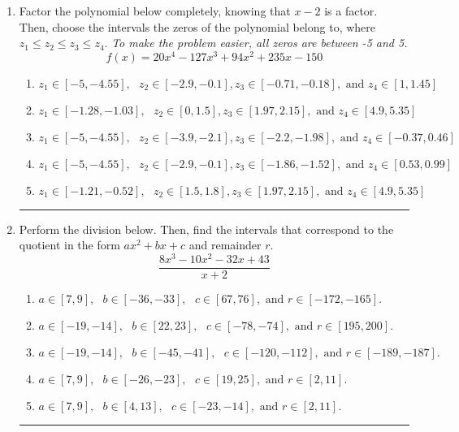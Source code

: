 \documentclass[14pt]{extbook}
\newcommand{\litem}[1]{\item#1\hspace*{-1cm}\rule{\textwidth}{0.4pt}}
\begin{document}
\begin{enumerate}
{\begin{enumerate}[label=\Alph*.]
\end{enumerate} }
\litem{
Factor the polynomial below completely, knowing that $x -2$ is a factor. Then, choose the intervals the zeros of the polynomial belong to, where $z_1 \leq z_2 \leq z_3 \leq z_4$. \textit{To make the problem easier, all zeros are between -5 and 5.}\[ f(x) = 20x^{4} -127 x^{3} +94 x^{2} +235 x -150 \]\begin{enumerate}[label=\Alph*.]
\item \( z_1 \in [-5, -4.55], \text{   }  z_2 \in [-2.9, -0.1], z_3 \in [-0.71, -0.18], \text{   and   } z_4 \in [1, 1.45] \)
\item \( z_1 \in [-1.28, -1.03], \text{   }  z_2 \in [0, 1.5], z_3 \in [1.97, 2.15], \text{   and   } z_4 \in [4.9, 5.35] \)
\item \( z_1 \in [-5, -4.55], \text{   }  z_2 \in [-3.9, -2.1], z_3 \in [-2.2, -1.98], \text{   and   } z_4 \in [-0.37, 0.46] \)
\item \( z_1 \in [-5, -4.55], \text{   }  z_2 \in [-2.9, -0.1], z_3 \in [-1.86, -1.52], \text{   and   } z_4 \in [0.53, 0.99] \)
\item \( z_1 \in [-1.21, -0.52], \text{   }  z_2 \in [1.5, 1.8], z_3 \in [1.97, 2.15], \text{   and   } z_4 \in [4.9, 5.35] \)

\end{enumerate} }
\litem{
Perform the division below. Then, find the intervals that correspond to the quotient in the form $ax^2+bx+c$ and remainder $r$.\[ \frac{8x^{3} -10 x^{2} -32 x + 43}{x + 2} \]\begin{enumerate}[label=\Alph*.]
\item \( a \in [7, 9], \text{   } b \in [-36, -33], \text{   } c \in [67, 76], \text{   and   } r \in [-172, -165]. \)
\item \( a \in [-19, -14], \text{   } b \in [22, 23], \text{   } c \in [-78, -74], \text{   and   } r \in [195, 200]. \)
\item \( a \in [-19, -14], \text{   } b \in [-45, -41], \text{   } c \in [-120, -112], \text{   and   } r \in [-189, -187]. \)
\item \( a \in [7, 9], \text{   } b \in [-26, -23], \text{   } c \in [19, 25], \text{   and   } r \in [2, 11]. \)
\item \( a \in [7, 9], \text{   } b \in [4, 13], \text{   } c \in [-23, -14], \text{   and   } r \in [2, 11]. \)


\end{enumerate}}
\end{enumerate}
\end{document}
